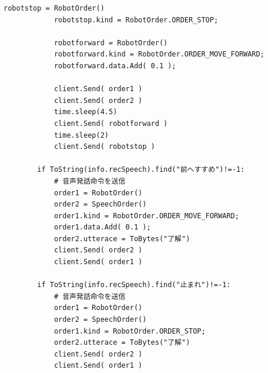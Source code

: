\documentclass[a4paper,11pt,titlepage]{jsarticle}
\begin{document}
\begin{lstlisting}[basicstyle=\ttfamily\footnotesize, caption = AudioTest.py, breaklines = true]
            robotstop = RobotOrder()
            robotstop.kind = RobotOrder.ORDER_STOP;

            robotforward = RobotOrder()
            robotforward.kind = RobotOrder.ORDER_MOVE_FORWARD;
            robotforward.data.Add( 0.1 );

            client.Send( order1 )
            client.Send( order2 )
            time.sleep(4.5)
            client.Send( robotforward )
            time.sleep(2)
            client.Send( robotstop )

        if ToString(info.recSpeech).find("前へすすめ")!=-1:
            # 音声発話命令を送信
            order1 = RobotOrder()
            order2 = SpeechOrder()
            order1.kind = RobotOrder.ORDER_MOVE_FORWARD;
            order1.data.Add( 0.1 );
            order2.utterace = ToBytes("了解")
            client.Send( order2 )
            client.Send( order1 )

        if ToString(info.recSpeech).find("止まれ")!=-1:
            # 音声発話命令を送信
            order1 = RobotOrder()
            order2 = SpeechOrder()
            order1.kind = RobotOrder.ORDER_STOP;
            order2.utterace = ToBytes("了解")
            client.Send( order2 )
            client.Send( order1 )
\end{lstlisting}
\end{document}
